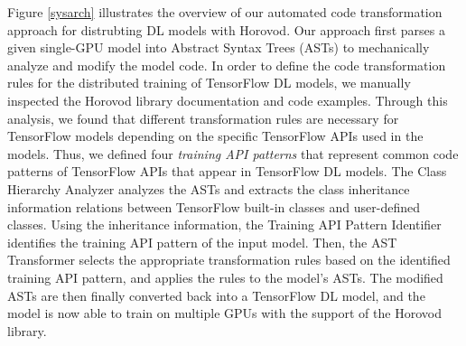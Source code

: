Figure \ref{sysarch} illustrates the overview of our automated code
transformation approach for distrubting DL models with Horovod.
Our approach first parses a given single-GPU model into Abstract Syntax Trees
(ASTs) to mechanically analyze and modify the model code.
In order to define the code transformation rules for the distributed training
of TensorFlow DL models, we manually inspected the Horovod library
documentation and code examples. 
Through this analysis, we found that different transformation rules are
necessary for TensorFlow models depending on the specific TensorFlow APIs used
in the models.
Thus, we defined four \textit{training API patterns} that represent common code
patterns of TensorFlow APIs that appear in TensorFlow DL models.
The {\sc Class Hierarchy Analyzer} analyzes the ASTs and extracts the class
inheritance information relations between TensorFlow built-in classes and
user-defined classes.
Using the inheritance information, the {\sc Training API Pattern Identifier}
identifies the training API pattern of the input model.
Then, the {\sc AST Transformer} selects the appropriate
transformation rules based on the identified training API pattern, and applies
the rules to the model's ASTs. 
The modified ASTs are then finally converted back into a TensorFlow DL
model, and the model is now able to train on multiple GPUs with the support of
the Horovod library.






